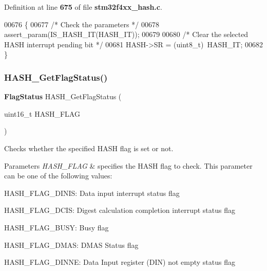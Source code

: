 Definition at line \textbf{ 675} of file \textbf{ stm32f4xx\+\_\+hash.\+c}.


\begin{DoxyCode}
00676 \{
00677   \textcolor{comment}{/* Check the parameters */}
00678   assert_param(IS_HASH_IT(HASH\_IT));
00679 
00680   \textcolor{comment}{/* Clear the selected HASH interrupt pending bit */}
00681   HASH->SR = (uint8\_t)~HASH\_IT;
00682 \}
\end{DoxyCode}
\mbox{\label{group__HASH__Group5_gae994fb4be1977f6ebb823f38839f7bd1}} 
\subsubsection{H\+A\+S\+H\+\_\+\+Get\+Flag\+Status()}
{\footnotesize\ttfamily \textbf{ Flag\+Status} H\+A\+S\+H\+\_\+\+Get\+Flag\+Status (\begin{DoxyParamCaption}\item[{uint16\+\_\+t}]{H\+A\+S\+H\+\_\+\+F\+L\+AG }\end{DoxyParamCaption})}



Checks whether the specified H\+A\+SH flag is set or not. 


\begin{DoxyParams}{Parameters}
{\em H\+A\+S\+H\+\_\+\+F\+L\+AG} & specifies the H\+A\+SH flag to check. This parameter can be one of the following values\+: \begin{DoxyItemize}
\item H\+A\+S\+H\+\_\+\+F\+L\+A\+G\+\_\+\+D\+I\+N\+IS\+: Data input interrupt status flag \item H\+A\+S\+H\+\_\+\+F\+L\+A\+G\+\_\+\+D\+C\+IS\+: Digest calculation completion interrupt status flag \item H\+A\+S\+H\+\_\+\+F\+L\+A\+G\+\_\+\+B\+U\+SY\+: Busy flag \item H\+A\+S\+H\+\_\+\+F\+L\+A\+G\+\_\+\+D\+M\+AS\+: D\+M\+AS Status flag \item H\+A\+S\+H\+\_\+\+F\+L\+A\+G\+\_\+\+D\+I\+N\+NE\+: Data Input register (D\+IN) not empty status flag \end{DoxyItemize}
\\
\hline
\end{DoxyParams}

